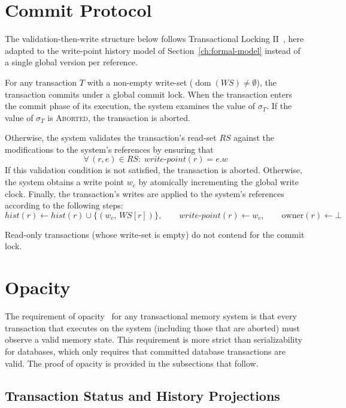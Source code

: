 \section{Commit Protocol}
\label{sec:commit-protocol}

The validation-then-write structure below follows Transactional Locking
II~\cite{dice2006transactional}, here adapted to the write-point history model
of Section~\ref{ch:formal-model} instead of a single global version per
reference.

For any transaction $T$ with a non-empty write-set
($\operatorname{dom}(WS) \neq \emptyset$), the transaction commits under a
global commit lock. When the transaction enters the commit phase of its
execution, the system examines the value of $\sigma_T$. If the value of
$\sigma_T$ is \textsc{Aborted}, the transaction is aborted.

Otherwise, the system validates the transaction's read-set $RS$ against the
modifications to the system's references by ensuring that
\[
  \forall\, (r, e) \in RS :\; \mathit{write\text{-}point}(r) = e.w
\]
If this validation condition is not satisfied, the transaction is aborted.
Otherwise, the system obtains a write point $w_c$ by atomically incrementing
the global write clock. Finally, the transaction's writes are applied to the
system's references according to the following steps:
\[
  \mathit{hist}(r) \gets \mathit{hist}(r) \cup \{(w_c,\, WS[r])\},
  \qquad
  \mathit{write\text{-}point}(r) \gets w_c,
  \qquad
  \text{owner}(r) \gets \bot
\]

Read-only transactions (whose write-set is empty) do not contend for the
commit lock.

\section{Opacity}
\label{sec:safety-opacity}

The requirement of opacity~\cite{guerraoui2007} for any transactional memory
system is that every transaction that executes on the system (including
those that are aborted) must observe a valid memory state. This requirement
is more strict than serializability for databases, which only requires that
committed database transactions are valid. The proof of opacity is provided
in the subsections that follow.

\subsection{Transaction Status and History Projections}
\label{subsec:status}

